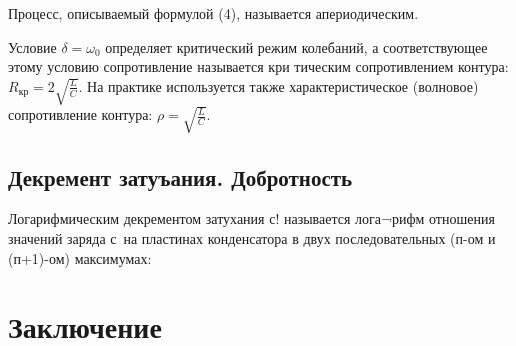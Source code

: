 Процесс, описываемый формулой (4), называется апериодическим.


Условие $\delta=\omega_0$ определяет критический режим колебаний, а соответствующее этому условию сопротивление называется кри 
тическим сопротивлением контура: $R_{\text{кр}}=2\sqrt{\frac{L}{C}}$. На практике используется также характеристическое (волновое) сопротивление 
контура: $\rho=\sqrt{\frac{L}{C}}$.
\subsection{Декремент затуъания. Добротность}
Логарифмическим декрементом затухания с! называется лога¬рифм отношения значений заряда с\ на пластинах конденсатора в двух последовательных (п-ом и (п+1)-ом) максимумах:
\newpage
\section{Заключение}

 